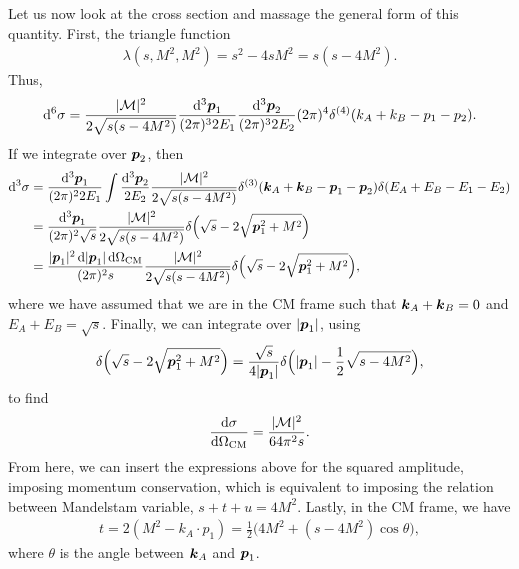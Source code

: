 {Let us now look at the cross section and massage the general form of this quantity.
First, the triangle function
\begin{align}
    \lambda(s,M^2,M^2) = s^2 - 4 s M^2 = s ( s - 4 M^2 )
.\end{align}
Thus,
\begin{align}
    \dd[6]{\sigma} = \frac{|\mathcal{M}|^2}{2 \sqrt{s(s - 4 M^2)}} \frac{\dd[3]{\vb*{p}_1}}{(2 \pi)^3 2 E_1} \frac{\dd[3]{\vb*{p}_{2}}}{(2 \pi)^3 2 E_2} (2 \pi)^{4} \delta^{(4)}(k_{A} + k_{B} - p_1 - p_2)
.\end{align}
If we integrate over $\vb*{p}_{2}$, then
\begin{align}
    \dd[3]{\sigma} &= \frac{\dd[3]{\vb*{p}_{1}}}{(2 \pi)^2 2 E_1} \int \frac{\dd[3]{\vb*{p}_{2}}}{2 E_2} \frac{|\mathcal{M}|^2}{2 \sqrt{s (s - 4 M^2)}} \delta^{(3)}(\vb*{k}_{A} + \vb*{k}_{B} - \vb*{p}_{1} - \vb*{p}_{2}) \delta(E_{A} + E_{B} - E_{1} - E_{2}) \nonumber \\
                   &= \frac{\dd[3]{\vb*{p}_{1}}}{(2 \pi)^2 \sqrt{s}} \frac{|\mathcal{M}|^2}{2 \sqrt{s (s - 4 M^2)}} \delta\Big( \sqrt{s} - 2 \sqrt{\vb*{p}_{1}^2 + M^2} \Big) \nonumber \\
                   &= \frac{|\vb*{p}_{1}|^2 \dd{|\vb*{p}_{1}| \dd{\Omega_{\rm CM}}}}{(2 \pi)^2 s} \frac{|\mathcal{M}|^2}{2 \sqrt{s (s - 4 M^2)}} \delta\Big( \sqrt{s} - 2 \sqrt{\vb*{p}_{1}^2 + M^2} \Big)
,\end{align}
where we have assumed that we are in the CM frame such that $\vb*{k}_{A} + \vb*{k}_{B} = 0$ and $E_{A} + E_{B} = \sqrt{s}$.
Finally, we can integrate over $|\vb*{p}_{1}|$, using 
\begin{align}
    \delta\Big( \sqrt{s} - 2 \sqrt{\vb*{p}_{1}^2 + M^2} \Big) = \frac{\sqrt{s}}{4 |\vb*{p}_{1}|} \delta\Big( |\vb*{p}_{1}| - \frac{1}{2} \sqrt{s - 4 M^2} \Big)
,\end{align}
to find
\begin{align}
    \dv{\sigma}{\Omega_{\rm CM}} = \frac{|\mathcal{M}|^2}{64 \pi^2 s}
.\end{align}
From here, we can insert the expressions above for the squared amplitude, imposing momentum conservation, which is equivalent to imposing the relation between Mandelstam variable, $s + t + u = 4 M^2$.
Lastly, in the CM frame, we have
\begin{align}
    t = 2 (M^2 - k_{A} \cdot p_1) = \frac{1}{2} \Big( 4 M^2 + (s - 4 M^2) \cos{\theta} \Big)
,\end{align}
where $\theta$ is the angle between $\vb*{k}_{A}$ and $\vb*{p}_{1}$.



}
    

